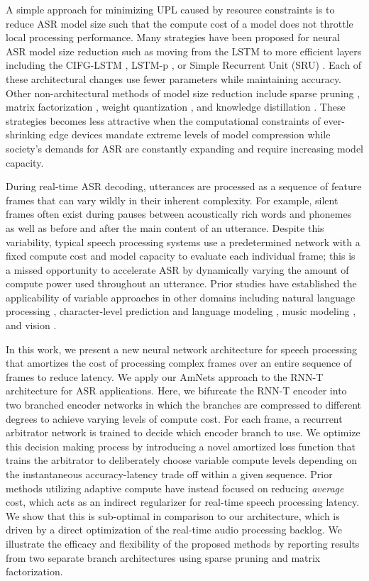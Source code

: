 \documentclass[a4paper]{article}
\begin{document}
A simple approach for minimizing UPL caused by resource constraints is to reduce ASR model size such that the compute cost of a model does not throttle local processing performance.
Many strategies have been proposed for neural ASR model size reduction such as moving from the LSTM \cite{Hochreiter1997} to more efficient layers including the CIFG-LSTM \cite{Greff2017}, LSTM-p \cite{Jia2017}, or Simple Recurrent Unit (SRU) \cite{Lei2018}. 
Each of these architectural changes use fewer parameters while maintaining accuracy. Other non-architectural methods of model size reduction include sparse pruning \cite{Zhu2018,Shangguan2019}, matrix factorization \cite{Pang2018}, weight quantization \cite{Alvarez2016,Nguyen2020}, and knowledge distillation \cite{Panchapagesan2020}. 
These strategies becomes less attractive when the computational constraints of ever-shrinking edge devices mandate extreme levels of model compression while society's demands for ASR are constantly expanding and require increasing model capacity.

During real-time ASR decoding, utterances are processed as a sequence of feature frames that can vary wildly in their inherent complexity. 
For example, silent frames often exist during pauses between acoustically rich words and phonemes as well as before and after the main content of an utterance. 
Despite this variability, typical speech processing systems use a predetermined network with a fixed compute cost and model capacity to evaluate each individual frame;
this is a missed opportunity to accelerate ASR by dynamically varying the amount of compute power used throughout an utterance. 
Prior studies have established the applicability of variable approaches in other domains including natural language processing \cite{Tyagi2020}, character-level prediction and language modeling \cite{Bengio2015b,Graves2016}, music modeling \cite{Jernite2016}, and vision \cite{Bolukbasi2017}.

In this work, we present a new neural network architecture for speech processing that amortizes the cost of processing complex frames over an entire sequence of frames to reduce latency. 
We apply our AmNets approach to the RNN-T architecture for ASR applications. 
Here, we bifurcate the RNN-T encoder into two branched encoder networks in which the branches are compressed to different degrees to achieve varying levels of compute cost. 
For each frame, a recurrent arbitrator network is trained to decide which encoder branch to use. 
We optimize this decision making process by introducing a novel amortized loss function that trains the arbitrator to deliberately choose variable compute levels depending on the instantaneous accuracy-latency trade off within a given sequence.
Prior methods utilizing adaptive compute have instead focused on reducing \emph{average} cost, which acts as an indirect regularizer for real-time speech processing latency.
We show that this is sub-optimal in comparison to our architecture, which is driven by a direct optimization of the real-time audio processing backlog. 
We illustrate the efficacy and flexibility of the proposed methods by reporting results from two separate branch architectures using sparse pruning and matrix factorization.
\end{document}
